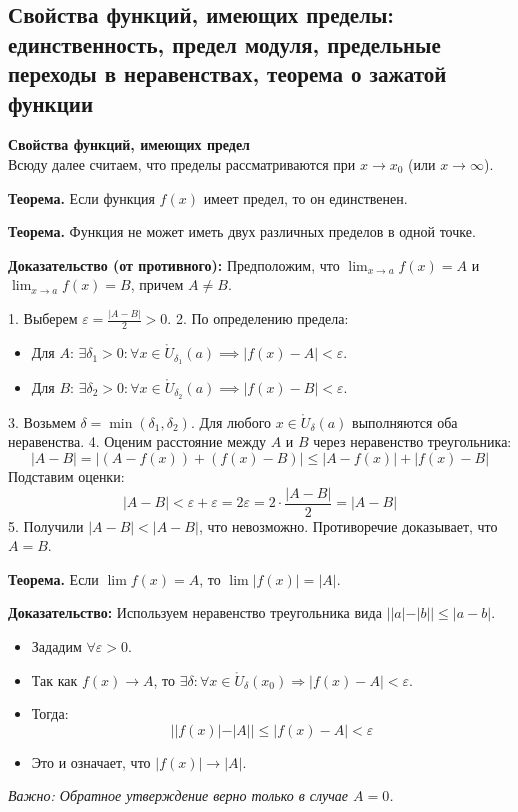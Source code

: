 \subsection{Свойства функций, имеющих пределы: единственность, предел модуля, предельные переходы в неравенствах, теорема о зажатой функции}

\textbf{Свойства функций, имеющих предел}\\
Всюду далее считаем, что пределы рассматриваются при $x \to x_0$ (или $x \to \infty$).

\textbf{Теорема.} Если функция $f(x)$ имеет предел, то он единственен.
\begin{tcolorbox}[title=1. Единственность предела]
    \textbf{Теорема.} Функция не может иметь двух различных пределов в одной точке.
    
    \textbf{Доказательство (от противного):}
    Предположим, что $\lim_{x\to a} f(x) = A$ и $\lim_{x\to a} f(x) = B$, причем $A \neq B$.
    
    1. Выберем $\varepsilon = \frac{|A - B|}{2} > 0$.
    2. По определению предела:
    \begin{itemize}
        \item Для $A$: $\exists \delta_1 > 0: \forall x \in \mathring{U}_{\delta_1}(a) \implies |f(x) - A| < \varepsilon$.
        \item Для $B$: $\exists \delta_2 > 0: \forall x \in \mathring{U}_{\delta_2}(a) \implies |f(x) - B| < \varepsilon$.
    \end{itemize}
    3. Возьмем $\delta = \min(\delta_1, \delta_2)$. Для любого $x \in \mathring{U}_\delta(a)$ выполняются оба неравенства.
    4. Оценим расстояние между $A$ и $B$ через неравенство треугольника:
    \[ |A - B| = |(A - f(x)) + (f(x) - B)| \leq |A - f(x)| + |f(x) - B| \]
    Подставим оценки:
    \[ |A - B| < \varepsilon + \varepsilon = 2\varepsilon = 2 \cdot \frac{|A - B|}{2} = |A - B| \]
    5. Получили $|A - B| < |A - B|$, что невозможно.
    Противоречие доказывает, что $A = B$.
\end{tcolorbox}

\textbf{Теорема.} Если $\lim f(x) = A$, то $\lim |f(x)| = |A|$.
\begin{tcolorbox}[title=2. Предел модуля]
	
	\textbf{Доказательство:}
	Используем неравенство треугольника вида $||a| - |b|| \leq |a - b|$.
	\begin{itemize}
		\item Зададим $\forall \varepsilon > 0$.
		\item Так как $f(x) \to A$, то $\exists \delta: \forall x \in \mathring{U}_\delta(x_0) \Rightarrow |f(x) - A| < \varepsilon$.
		\item Тогда:
		$$ ||f(x)| - |A|| \leq |f(x) - A| < \varepsilon $$
		\item Это и означает, что $|f(x)| \to |A|$.
	\end{itemize}
	\textit{Важно: Обратное утверждение верно только в случае $A=0$.}
\end{tcolorbox}

